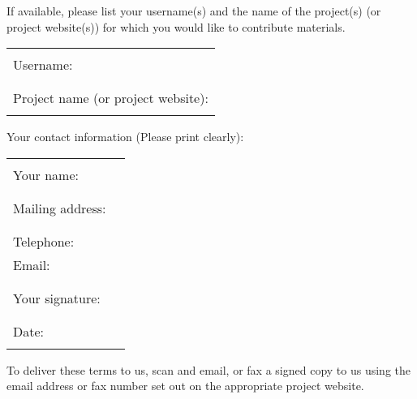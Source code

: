 \documentclass[12pt, a4paper]{article}
\begin{document}
If available, please list your username(s) and the name of the
project(s) (or project website(s)) for which you would like to
contribute materials.\vspace{1em}\newline
\begin{tabularx}{\textwidth}{|X|}
  \hline
  \\
  Username:\\
  \\
  \hline
  \\
  Project name (or project website):\\
  \\
  \hline
\end{tabularx}
Your contact information (Please print clearly):\newline
\begin{tabularx}{\textwidth}{|X|l}
  \hline
  \\
  Your name:\\
  \\
  \hline
  \\
  Mailing address:\\
  \\
  \hline
  \\
  Telephone:\\
  Email:\\
  \\
  \hline
  \\
  Your signature:\\
  \\
  \hline
  \\
  Date:\\
  \\
  \hline

\end{tabularx}
\vspace{1em}

To deliver these terms to us, scan and email, or fax a signed copy to
us using the email address or fax number set out on the appropriate
project website.
\end{document}
